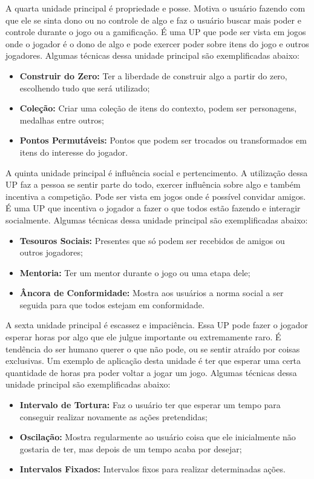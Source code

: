 A quarta unidade principal é propriedade e posse. Motiva o usuário fazendo com que ele se sinta dono ou no controle de algo e faz o usuário buscar mais poder e controle durante o jogo ou a gamificação. É uma UP que pode ser vista em jogos onde o jogador é o dono de algo e pode exercer poder sobre itens do jogo e outros jogadores. Algumas técnicas dessa unidade principal são exemplificadas abaixo:

\begin{itemize}
\item  \textbf{Construir do Zero:} Ter a liberdade de construir algo a partir do zero, escolhendo tudo que será utilizado;
\item  \textbf{Coleção:} Criar uma coleção de itens do contexto, podem ser personagens, medalhas entre outros;
\item  \textbf{Pontos Permutáveis:} Pontos que podem ser trocados ou transformados em itens do interesse do jogador.
\end{itemize}

A quinta unidade principal é influência social e pertencimento. A  utilização dessa UP faz a pessoa se sentir parte do todo, exercer influência sobre algo e também incentiva a competição. Pode ser vista em jogos onde é possível convidar amigos. É uma UP que incentiva o jogador a fazer o que todos estão fazendo e interagir socialmente. Algumas técnicas dessa unidade principal são exemplificadas abaixo:

\begin{itemize}
\item  \textbf{Tesouros Sociais:} Presentes que só podem ser recebidos de amigos ou outros jogadores;
\item  \textbf{Mentoria:} Ter um mentor durante o jogo ou uma etapa dele;
\item  \textbf{Âncora de Conformidade:} Mostra aos usuários a norma social a ser seguida para que todos estejam em conformidade.
\end{itemize}

A sexta unidade principal é escassez e impaciência. Essa UP pode fazer o jogador esperar horas por algo que ele julgue importante ou extremamente raro. É tendência do ser humano querer o que não pode, ou se sentir atraído por coisas exclusivas. Um exemplo de aplicação desta unidade é ter que esperar uma certa quantidade de horas pra poder voltar a jogar um jogo. Algumas técnicas dessa unidade principal são exemplificadas abaixo:

\begin{itemize}
\item  \textbf{Intervalo de Tortura:} Faz o usuário ter que esperar um tempo para conseguir realizar novamente as ações pretendidas;
\item  \textbf{Oscilação:} Mostra regularmente ao usuário coisa que ele inicialmente não gostaria de ter, mas depois de um tempo acaba por desejar;
\item  \textbf{Intervalos Fixados:} Intervalos fixos para realizar determinadas ações.
\end{itemize}

